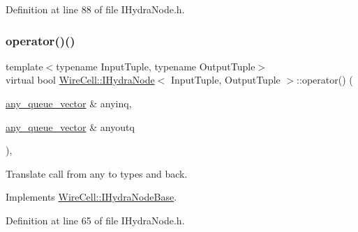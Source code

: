 Definition at line 88 of file I\+Hydra\+Node.\+h.

\mbox{\label{class_wire_cell_1_1_i_hydra_node_a2178e400b1539cfb77616bfb6e842fbf}} 
\subsubsection{\texorpdfstring{operator()()}{operator()()}\hspace{0.1cm}{\footnotesize\ttfamily [1/2]}}
{\footnotesize\ttfamily template$<$typename Input\+Tuple, typename Output\+Tuple$>$ \\
virtual bool \hyperlink{class_wire_cell_1_1_i_hydra_node}{Wire\+Cell\+::\+I\+Hydra\+Node}$<$ Input\+Tuple, Output\+Tuple $>$\+::operator() (\begin{DoxyParamCaption}\item[{\hyperlink{class_wire_cell_1_1_i_hydra_node_base_aab191670a86f2835da2aa07ab5e6372d}{any\+\_\+queue\+\_\+vector} \&}]{anyinq,  }\item[{\hyperlink{class_wire_cell_1_1_i_hydra_node_base_aab191670a86f2835da2aa07ab5e6372d}{any\+\_\+queue\+\_\+vector} \&}]{anyoutq }\end{DoxyParamCaption})\hspace{0.3cm}{\ttfamily [inline]}, {\ttfamily [virtual]}}



Translate call from any to types and back. 



Implements \hyperlink{class_wire_cell_1_1_i_hydra_node_base_a7840530686daf7ba07beaf74c68b3d02}{Wire\+Cell\+::\+I\+Hydra\+Node\+Base}.



Definition at line 65 of file I\+Hydra\+Node.\+h.

\mbox{\label{class_wire_cell_1_1_i_hydra_node_a394933c1f99619e38d65282374dedd7a}} 
